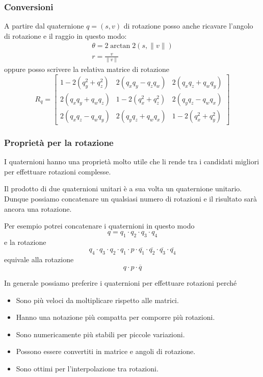 \subsubsection{Conversioni}
A partire dal quaternione $q = (s, v)$ di rotazione posso anche ricavare l'angolo di rotazione e il raggio in questo modo:
\begin{gather*}
	\theta = 2 \arctan 2 (s, \| v \|) \\
	r = \frac{v}{\| v \|}
\end{gather*}
oppure posso scrivere la relativa matrice di rotazione
\[
	R_q = \begin{bmatrix}
		1 - 2 (q_y^2 + q_z^2) & 2 (q_x q_y - q_z q_w) & 2 (q_x q_z + q_w q_y) \\
		2 (q_x q_y + q_w q_z) & 1 - 2 (q_x^2 + q_z^2) & 2 (q_y q_z - q_w q_x) \\
		2 (q_x q_z - q_w q_y) & 2 (q_y q_z + q_w q_x) & 1 - 2 (q_x^2 + q_y^2)
	\end{bmatrix}
\]

\subsubsection{Propriet\`a per la rotazione}
I quaternioni hanno una propriet\`a molto utile che li rende tra i candidati migliori per effettuare rotazioni complesse.

Il prodotto di due quaternioni unitari \`e a sua volta un quaternione unitario. Dunque possiamo
concatenare un qualsiasi numero di rotazioni e il risultato sar\`a ancora una rotazione.

Per esempio potrei concatenare i quaternioni in questo modo
\[ q = q_1 \cdot q_2 \cdot q_3 \cdot q_4 \]
e la rotazione
\[
	q_4 \cdot q_3 \cdot q_2 \cdot q_1 \cdot p \cdot
	\overline{q_1} \cdot \overline{q_2} \cdot \overline{q_3} \cdot \overline{q_4}
\]
equivale alla rotazione
\[ q \cdot p \cdot \overline{q} \]

In generale possiamo preferire i quaternioni per effettuare rotazioni perch\'e
\begin{itemize}
	\item Sono pi\`u veloci da moltiplicare rispetto alle matrici.
	\item Hanno una notazione pi\`u compatta per comporre pi\`u rotazioni.
	\item Sono numericamente pi\`u stabili per piccole variazioni.
	\item Possono essere convertiti in matrice e angoli di rotazione.
	\item Sono ottimi per l'interpolazione tra rotazioni.
\end{itemize}